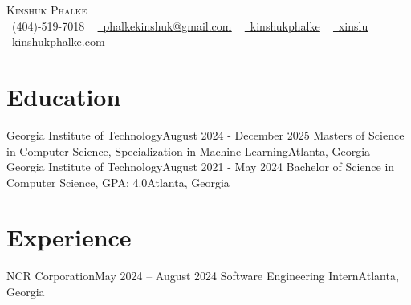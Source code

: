 \begin{center}
    {\Huge \scshape Kinshuk Phalke} \\ \vspace{5pt}
    \small \raisebox{-0.1\height}\faPhone\ (404)-519-7018 ~ \href{mailto:phalkekinshuk@gmail.com}{\raisebox{-0.2\height}\faEnvelope\  \underline{phalkekinshuk@gmail.com}} ~ 
    \href{https://linkedin.com/in/kinshukphalke/}{\raisebox{-0.2\height}\faLinkedin\ \underline{kinshukphalke}}  ~
    \href{https://github.com/xinslu}{\raisebox{-0.2\height}\faGithub\ \underline{xinslu}} ~
    \href{https://kinshukphalke.com/}{\raisebox{-0.2\height}\faLink\ \underline{kinshukphalke.com}}
    \vspace{-8pt}
\end{center}


\section{Education}
  \resumeSubHeadingListStart
    \resumeSubheading
      {Georgia Institute of Technology}{August 2024 - December 2025}
      {Masters of Science in Computer Science, Specialization in Machine Learning}{Atlanta, Georgia}
  \resumeSubHeadingListEnd
\vspace{-5pt}
  \resumeSubHeadingListStart
    \resumeSubheading
      {Georgia Institute of Technology}{August 2021 - May 2024}
      {Bachelor of Science in Computer Science, GPA: 4.0}{Atlanta, Georgia}
    \resumeItemListStart
    \resumeItemListEnd
  \resumeSubHeadingListEnd

  \vspace{-16pt}


\section{Experience}

  \resumeSubHeadingListStart

    \resumeSubheading
      {NCR Corporation}{May 2024 -- August 2024}
      {Software Engineering Intern}{Atlanta, Georgia}
      \resumeItemListStart
      \resumeItemListEnd

